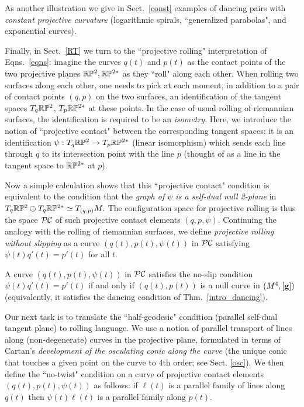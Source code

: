 \sn 

 As another illustration we give in Sect.~\ref{const}  examples of dancing pairs with {\em constant projective curvature} (logarithmic spirals, ``generalized parabolas", and exponential curves).  

Finally, in  Sect.~\ref{RT} we turn to   the  ``projective rolling" interpretation of Eqns.~\eqref{eqns}: imagine the curves $q(t)$ and $p(t)$ as the contact points of the two projective planes $ \mathbb{R}\mathbb{P}^2 ,  \mathbb{R}\mathbb{P}^{2*}$ as they ``roll" along each other. When rolling two surfaces along each other, one needs to pick at each moment, in addition to a pair of contact points $(q,p)$ on the two surfaces, an identification of   the tangent spaces $T_q\mathbb{R}\mathbb{P}^2$, $T_p\mathbb{R}\mathbb{P}^{2*}$ at these points. 
In the case of usual rolling of riemannian surfaces, the identification is required to be an {\em isometry}. 
Here, we introduce the notion of ``projective contact" between the corresponding tangent spaces: 
it is an identification $\psi:T_q\mathbb{R}\mathbb{P}^2\to T_p\mathbb{R}\mathbb{P}^{2*}$ (linear isomorphism) which  sends each line through 
$q$ to its intersection point with the line $p$ (thought of as a line in the tangent space to $\mathbb{R}\mathbb{P}^{2*}$ at $p$).
 
 
 Now a simple calculation shows that this ``projective contact" condition is equivalent   to the condition that the 
 {\em graph of $\psi$  is a self-dual null 2-plane} in $T_q\mathbb{R}\mathbb{P}^2\oplus T_q\mathbb{R}\mathbb{P}^{2*}\simeq T_{(q,p)}M.$ 
 The configuration space for projective rolling is thus the space $\mathcal{PC}$ of such projective contact 
 elements  $(q,p,\psi)$. Continuing the 
 analogy with the rolling of riemannian surfaces, we define {\em projective rolling without slipping} 
 as a curve    $(q(t), p(t), \psi(t))$ in $\mathcal{PC}$ satisfying $\psi(t)q'(t)=p'(t)$ for all $t$. 
\begin{theorem}
A curve $(q(t),p(t),\psi(t))$ in $\mathcal{PC}$ satisfies the no-slip condition $\psi(t)q'(t)=p'(t)$ if and only if $(q(t),p(t))$ is  a null curve in $(M^4,[\mathbf{ g}])$ (equivalently, it satisfies the dancing condition of Thm.~\ref{intro_dancing}). 
\end{theorem} 

Our next task is to  translate the ``half-geodesic" condition (parallel self-dual tangent plane) to rolling language. We use a notion of parallel transport of lines along (non-degenerate) curves in the projective plane, formulated in terms of Cartan's {\em development of the osculating conic along the curve}  (the unique  conic that touches a given point on the curve to 4th order; see Sect. \ref{osc}). We then define the ``no-twist" condition on a curve of projective contact elements  $(q(t),p(t),\psi(t))$ as follows: if  $\ell(t)$ is a parallel family of lines along $q(t)$ then $\psi(t)\ell(t)$ is a parallel family along $p(t)$. 

